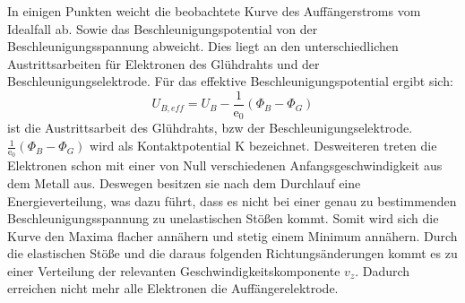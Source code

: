 In einigen Punkten weicht die beobachtete Kurve des Auffängerstroms vom Idealfall ab.
Sowie das Beschleunigungspotential von der Beschleunigungsspannung abweicht.
Dies liegt an den unterschiedlichen Austrittsarbeiten für Elektronen des Glühdrahts und der Beschleunigungselektrode.
Für das effektive Beschleunigungspotential ergibt sich:
\begin{equation}
    U_{B,eff} = U_B - \frac{1}{\text{e}_0}(\Phi_B - \Phi_G)
    \label{eqn:gl5}
\end{equation}
\Phi ist die Austrittsarbeit des Glühdrahts, bzw der Beschleunigungselektrode.
$\frac{1}{\text{e}_0}(\Phi_B - \Phi_G)$ wird als Kontaktpotential K bezeichnet.
Desweiteren treten die Elektronen schon mit einer von Null verschiedenen Anfangsgeschwindigkeit aus dem Metall aus.
Deswegen besitzen sie nach dem Durchlauf eine Energieverteilung, was dazu führt, dass es nicht bei einer genau zu bestimmenden Beschleunigungsspannung zu unelastischen Stößen kommt.
Somit wird sich die Kurve den Maxima flacher annähern und stetig einem Minimum annähern.
Durch die elastischen Stöße und die daraus folgenden Richtungsänderungen kommt es zu einer Verteilung  der relevanten Geschwindigkeitskomponente $v_z$.
Dadurch erreichen nicht mehr alle Elektronen die Auffängerelektrode.
